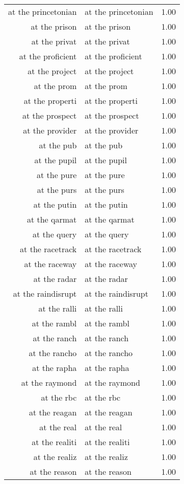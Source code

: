 \begin{table}[ht]
\begin{tabular}{rlr}
  at the princetonian & at the princetonian & 1.00 \\ 
  at the prison & at the prison & 1.00 \\ 
  at the privat & at the privat & 1.00 \\ 
  at the proficient & at the proficient & 1.00 \\ 
  at the project & at the project & 1.00 \\ 
  at the prom & at the prom & 1.00 \\ 
  at the properti & at the properti & 1.00 \\ 
  at the prospect & at the prospect & 1.00 \\ 
  at the provider & at the provider & 1.00 \\ 
  at the pub & at the pub & 1.00 \\ 
  at the pupil & at the pupil & 1.00 \\ 
  at the pure & at the pure & 1.00 \\ 
  at the purs & at the purs & 1.00 \\ 
  at the putin & at the putin & 1.00 \\ 
  at the qarmat & at the qarmat & 1.00 \\ 
  at the query & at the query & 1.00 \\ 
  at the racetrack & at the racetrack & 1.00 \\ 
  at the raceway & at the raceway & 1.00 \\ 
  at the radar & at the radar & 1.00 \\ 
  at the raindisrupt & at the raindisrupt & 1.00 \\ 
  at the ralli & at the ralli & 1.00 \\ 
  at the rambl & at the rambl & 1.00 \\ 
  at the ranch & at the ranch & 1.00 \\ 
  at the rancho & at the rancho & 1.00 \\ 
  at the rapha & at the rapha & 1.00 \\ 
  at the raymond & at the raymond & 1.00 \\ 
  at the rbc & at the rbc & 1.00 \\ 
  at the reagan & at the reagan & 1.00 \\ 
  at the real & at the real & 1.00 \\ 
  at the realiti & at the realiti & 1.00 \\ 
  at the realiz & at the realiz & 1.00 \\ 
  at the reason & at the reason & 1.00 \\ 

\end{tabular}
\end{table}
